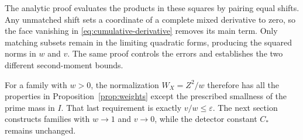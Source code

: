 The analytic proof evaluates the products in these squares by pairing
equal shifts. Any unmatched shift sets a coordinate of a complete
mixed derivative to zero, so the face vanishing in
\eqref{eq:cumulative-derivative} removes its main term. Only matching
subsets remain in the limiting quadratic forms, producing the squared
norms in $w$ and $v$. The same proof controls the errors and establishes
the two different second-moment bounds.

For a family with $w>0$, the normalization $W_X=Z^2/w$ therefore has
all the properties in Proposition~\ref{prop:weights} except the
prescribed smallness of the prime mass in $I$. That last requirement
is exactly $v/w\le\varepsilon$. The next section constructs families
with $w\to1$ and $v\to0$, while the detector constant $C_*$ remains
unchanged.
